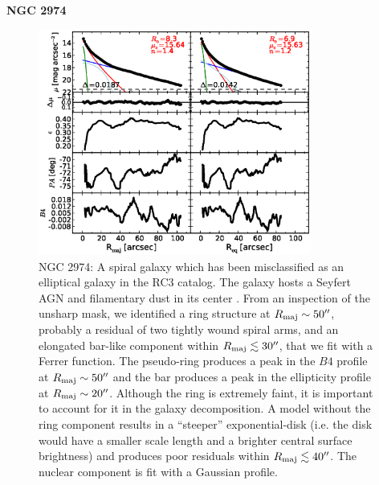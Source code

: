 \documentclass[preprint2]{emulateapj}
\newcommand{\fitfigurewidth}{0.8\textwidth}
\begin{document}
  \clearpage\newpage\noindent
  {\bf NGC 2974 \\}

  \begin{figure}[h]
  \begin{center}
  \includegraphics[width=\fitfigurewidth]{images/n2974_1Dfit.eps}
  \caption{NGC 2974: 
  A spiral galaxy which has been misclassified as an elliptical galaxy in the RC3 catalog.
  The galaxy hosts a Seyfert AGN \citep{veroncettyveron2006} and filamentary dust in its center \citep{tran2001}.
  From an inspection of the unsharp mask, we identified a ring structure at $R_{\rm maj} \sim 50''$, 
  probably a residual of two tightly wound spiral arms,
  and an elongated bar-like component within $R_{\rm maj} \lesssim 30''$, that we fit with a Ferrer function.
  The pseudo-ring produces a peak in the $B4$ profile at $R_{\rm maj} \sim 50''$ and 
  the bar produces a peak in the ellipticity profile at $R_{\rm maj} \sim 20''$.
  Although the ring is extremely faint, it is important to account for it in the galaxy decomposition. 
  A model without the ring component results in a ``steeper'' exponential-disk (i.e. the disk would have a smaller scale length 
  and a brighter central surface brightness) and produces poor residuals within $R_{\rm maj} \lesssim 40''$.
  The nuclear component is fit with a Gaussian profile.
  }
  \end{center}
  \end{figure}
\end{document}
